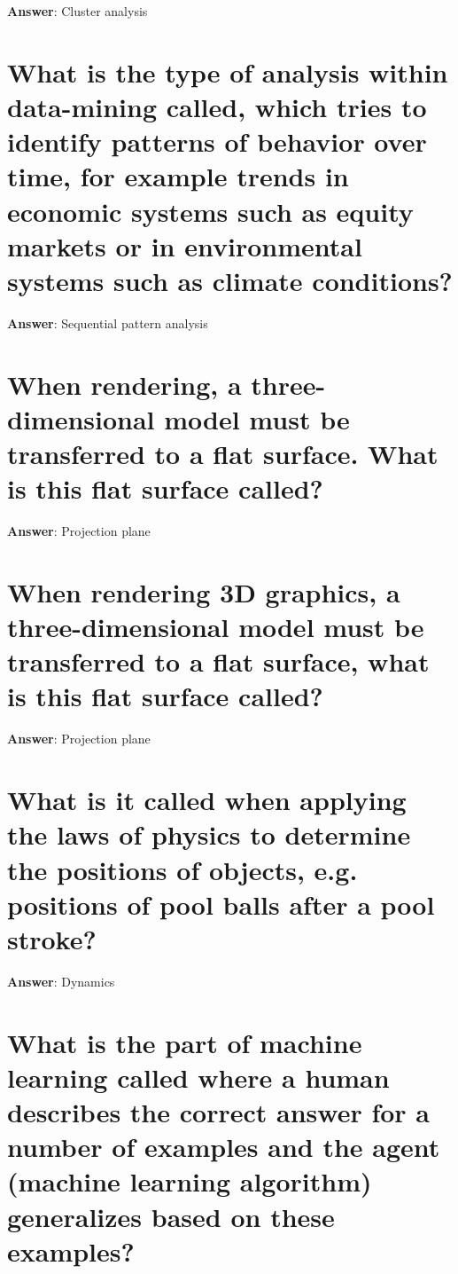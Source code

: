 \documentclass[a4paper,11pt,oneside]{book}
\begin{document}
\begin{sloppypar}
\label{q:57:sa:en:True}

\textbf{Answer}: Cluster analysis



\section{What is the type of analysis within data-mining called, which tries to identify patterns of behavior over time, for example trends in economic systems such as equity markets or in environmental systems such as climate conditions?}

\label{q:58:sa:en:True}

\textbf{Answer}: Sequential pattern analysis



\section{When rendering, a three-dimensional model must be transferred to a flat surface. What is this flat surface called?}

\label{q:59:sa:en:True}

\textbf{Answer}: Projection plane



\section{When rendering 3D graphics, a three-dimensional model must be transferred to a flat surface, what is this flat surface called?}

\label{q:60:sa:en:True}

\textbf{Answer}: Projection plane



\section{What is it called when applying the laws of physics to determine the positions of objects, e.g. positions of pool balls after a pool stroke?}

\label{q:61:sa:en:True}

\textbf{Answer}: Dynamics



\section{What is the part of machine learning called where a human describes the correct answer for a number of examples and the agent (machine learning algorithm) generalizes based on these examples?}


\end{sloppypar}
\end{document}
